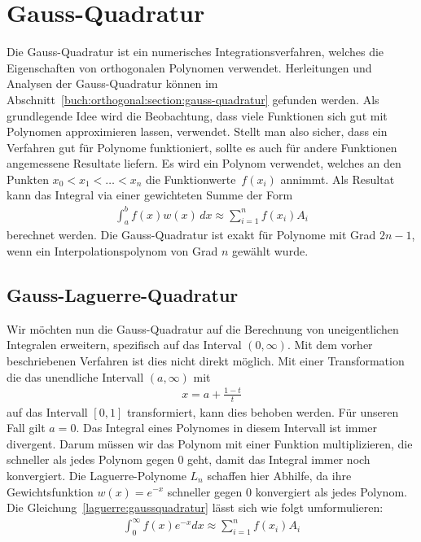 %
%
%
\section{Gauss-Quadratur
  \label{laguerre:section:quadratur}}
Die Gauss-Quadratur ist ein numerisches Integrationsverfahren,
welches die Eigenschaften von orthogonalen Polynomen verwendet.
Herleitungen und Analysen der Gauss-Quadratur können im 
Abschnitt~\ref{buch:orthogonal:section:gauss-quadratur} gefunden werden.
Als grundlegende Idee wird die Beobachtung,
dass viele Funktionen sich gut mit Polynomen approximieren lassen,
verwendet.
Stellt man also sicher,
dass ein Verfahren gut für Polynome funktioniert, 
sollte es auch für andere Funktionen angemessene Resultate liefern.
Es wird ein Polynom verwendet, 
welches an den Punkten $x_0 < x_1 < \ldots < x_n$ 
die Funktionwerte~$f(x_i)$ annimmt.
Als Resultat kann das Integral via einer gewichteten Summe der Form
\begin{align}
\int_a^b f(x) w(x) \, dx
\approx
\sum_{i=1}^n f(x_i) A_i
\label{laguerre:gaussquadratur}
\end{align}
berechnet werden.
Die Gauss-Quadratur ist exakt für Polynome mit Grad $2n -1$,
wenn ein Interpolationspolynom von Grad $n$ gewählt wurde.

\subsection{Gauss-Laguerre-Quadratur
\label{laguerre:subsection:gausslag-quadratur}}
Wir möchten nun die Gauss-Quadratur auf die Berechnung
von uneigentlichen Integralen erweitern,
spezifisch auf das Interval $(0, \infty)$.
Mit dem vorher beschriebenen Verfahren ist dies nicht direkt möglich.
Mit einer Transformation die das unendliche Intervall $(a, \infty)$ mit
\begin{align*}
x
=
a + \frac{1 - t}{t}
\end{align*}
auf das Intervall $[0, 1]$ transformiert,
kann dies behoben werden.
Für unseren Fall gilt $a = 0$.
Das Integral eines Polynomes in diesem Intervall ist immer divergent.
Darum müssen wir das Polynom mit einer Funktion multiplizieren,
die schneller als jedes Polynom gegen $0$ geht,
damit das Integral immer noch konvergiert.
Die Laguerre-Polynome $L_n$ schaffen hier Abhilfe,
da ihre Gewichtsfunktion $w(x) = e^{-x}$ schneller
gegen $0$ konvergiert als jedes Polynom.
Die Gleichung~\eqref{laguerre:gaussquadratur} lässt sich wie folgt
umformulieren:
\begin{align}
\int_{0}^{\infty} f(x) e^{-x} dx
\approx
\sum_{i=1}^{n} f(x_i) A_i
\label{laguerre:laguerrequadratur}
\end{align}

